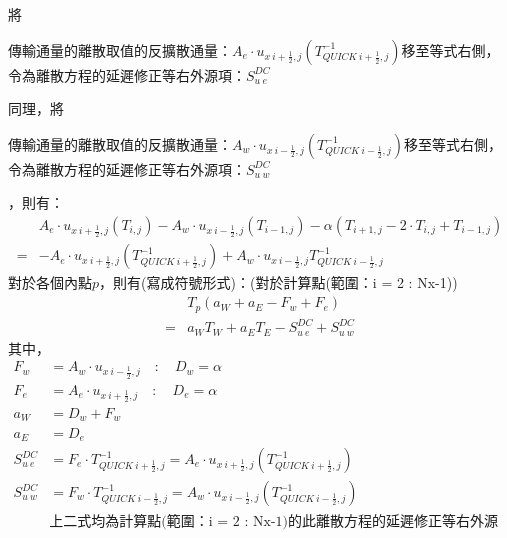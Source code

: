 \documentclass[12pt]{article}
\begin{document}
\noindent 將\begin{center}傳輸通量的離散取值的反擴散通量：$A_{e}\cdot u_{x\ i+\frac{1}{2},j}(T_{QUICK\ i+\frac{1}{2},j}^{-1})$移至等式右側，令為離散方程的延遲修正等右外源項：$S_{u\ e}^{DC}$\end{center}
同理，將\begin{center}傳輸通量的離散取值的反擴散通量：$A_{w}\cdot u_{x\ i-\frac{1}{2},j}(T_{QUICK\ i-\frac{1}{2},j}^{-1})$移至等式右側，令為離散方程的延遲修正等右外源項：$S_{u\ w}^{DC}$\end{center}，則有：\\
\begin{equation}
    \begin{split}
        & A_{e}\cdot u_{x\ i+\frac{1}{2},j}(T_{i,j}) - A_{w}\cdot u_{x\ i-\frac{1}{2},j}(T_{i-1,j}) - \alpha (T_{i+1,j} -2\cdot T_{i,j} + T_{i-1,j}) \\
        = & - A_{e}\cdot u_{x\ i+\frac{1}{2},j}(T_{QUICK\ i+\frac{1}{2},j}^{-1}) + A_{w}\cdot u_{x\ i-\frac{1}{2},j}T_{QUICK\ i-\frac{1}{2},j}^{-1}
    \end{split}
\end{equation}
\noindent 對於各個內點$p$，則有(寫成符號形式)：(對於計算點(範圍：i = 2 : Nx-1))\\
\begin{equation}
    \begin{split}
        &T_{p}(a_{W} + a_{E} - F_{w} + F_{e})\\
         = &a_{W}T_{W} + a_{E}T_{E} - S_{u\ e}^{DC}+ S_{u\ w}^{DC} 
    \end{split}
\end{equation}
\noindent 其中，
\begin{equation}
\begin{split}
    F_{w} &= A_{w}\cdot u_{x\ i-\frac{1}{2},j} \quad:\quad D_{w} = \alpha\\
    F_{e} &= A_{e}\cdot u_{x\ i+\frac{1}{2},j} \quad:\quad D_{e} = \alpha \\
    a_{W} &= D_{w} + F_{w} \\
    a_{E} &= D_{e} \\
    S_{u\ e}^{DC} &= F_{e}\cdot T_{QUICK\ i+\frac{1}{2},j}^{-1} = A_{e} \cdot u_{x\ i+\frac{1}{2},j}(T_{QUICK\ i+\frac{1}{2},j}^{-1}) \\
    S_{u\ w}^{DC} &= F_{w}\cdot T_{QUICK\ i-\frac{1}{2},j}^{-1} = A_{w} \cdot u_{x\ i-\frac{1}{2},j}(T_{QUICK\ i-\frac{1}{2},j}^{-1}) \\
    &\mbox{上二式均為計算點(範圍：i = 2 : Nx-1)的此離散方程的延遲修正等右外源項}\\
\end{split}
\end{equation}
\newpage
\vspace{-0.5cm}
\end{document}
